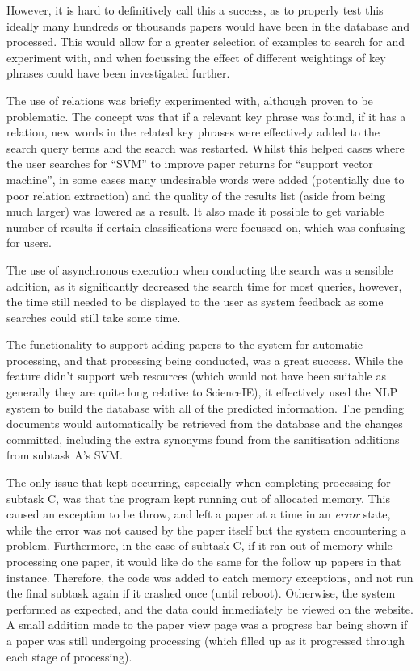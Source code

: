However, it is hard to definitively call this a success, as to properly test this ideally many hundreds or thousands papers would have been in the database and processed. This would allow for a greater selection of examples to search for and experiment with, and when focussing the effect of different weightings of key phrases could have been investigated further. 

The use of relations was briefly experimented with, although proven to be problematic. The concept was that if a relevant key phrase was found, if it has a relation, new words in the related key phrases were effectively added to the search query terms and the search was restarted. Whilst this helped cases where the user searches for ``SVM'' to improve paper returns for ``support vector machine'', in some cases many undesirable words were added (potentially due to poor relation extraction) and the quality of the results list (aside from being much larger) was lowered as a result. It also made it possible to get variable number of results if certain classifications were focussed on, which was confusing for users.

The use of asynchronous execution when conducting the search was a sensible addition, as it significantly decreased the search time for most queries, however, the time still needed to be displayed to the user as system feedback as some searches could still take some time. 

The functionality to support adding papers to the system for automatic processing, and that processing being conducted, was a great success. While the feature didn't support web resources (which would not have been suitable as generally they are quite long relative to ScienceIE), it effectively used the NLP system to build the database with all of the predicted information. The pending documents would automatically be retrieved from the database and the changes committed, including the extra synonyms found from the sanitisation additions from subtask A's SVM.

The only issue that kept occurring, especially when completing processing for subtask C, was that the program kept running out of allocated memory. This caused an exception to be throw, and left a paper at a time in an \textit{error} state, while the error was not caused by the paper itself but the system encountering a problem. Furthermore, in the case of subtask C, if it ran out of memory while processing one paper, it would like do the same for the follow up papers in that instance. Therefore, the code was added to catch memory exceptions, and not run the final subtask again if it crashed once (until reboot). Otherwise, the system performed as expected, and the data could immediately be viewed on the website. A small addition made to the paper view page was a progress bar being shown if a paper was still undergoing processing (which filled up as it progressed through each stage of processing).

